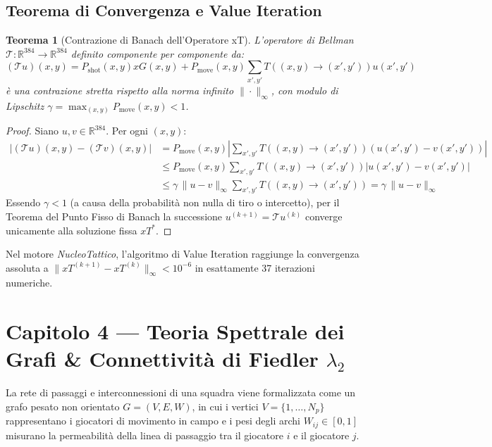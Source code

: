\documentclass[11pt,a4paper]{article}
\newtheorem{teorema}{Teorema}[section]
\begin{document}
\subsection{Teorema di Convergenza e Value Iteration}
\begin{teorema}[Contrazione di Banach dell'Operatore xT]
L'operatore di Bellman $\mathcal{T}: \mathbb{R}^{384} \to \mathbb{R}^{384}$ definito componente per componente da:
\begin{equation}
(\mathcal{T} u)(x, y) = P_{\text{shot}}(x, y) xG(x, y) + P_{\text{move}}(x, y) \sum_{x', y'} T((x, y) \to (x', y')) u(x', y')
\end{equation}
è una contrazione stretta rispetto alla norma infinito $\|\cdot\|_\infty$, con modulo di Lipschitz $\gamma = \max_{(x, y)} P_{\text{move}}(x, y) < 1$.
\end{teorema}
\begin{proof}
Siano $u, v \in \mathbb{R}^{384}$. Per ogni $(x, y)$:
\begin{equation}
\begin{aligned}
|(\mathcal{T} u)(x, y) - (\mathcal{T} v)(x, y)| &= P_{\text{move}}(x, y) \left| \sum_{x', y'} T((x,y) \to (x',y')) (u(x', y') - v(x', y')) \right| \\
&\le P_{\text{move}}(x, y) \sum_{x', y'} T((x,y) \to (x',y')) |u(x', y') - v(x', y')| \\
&\le \gamma \, \|u - v\|_\infty \sum_{x', y'} T((x,y) \to (x',y')) = \gamma \, \|u - v\|_\infty
\end{aligned}
\end{equation}
Essendo $\gamma < 1$ (a causa della probabilità non nulla di tiro o intercetto), per il Teorema del Punto Fisso di Banach la successione $u^{(k+1)} = \mathcal{T} u^{(k)}$ converge unicamente alla soluzione fissa $xT^*$.
\end{proof}
Nel motore \textsl{NucleoTattico}, l'algoritmo di Value Iteration raggiunge la convergenza assoluta a $\|xT^{(k+1)} - xT^{(k)}\|_\infty < 10^{-6}$ in esattamente 37 iterazioni numeriche.


\section{Capitolo 4 — Teoria Spettrale dei Grafi \& Connettività di Fiedler $\lambda_2$}

La rete di passaggi e interconnessioni di una squadra viene formalizzata come un grafo pesato non orientato $G = (V, E, W)$, in cui i vertici $V = \{1, \dots, N_p\}$ rappresentano i giocatori di movimento in campo e i pesi degli archi $W_{ij} \in [0, 1]$ misurano la permeabilità della linea di passaggio tra il giocatore $i$ e il giocatore $j$.
\end{document}
